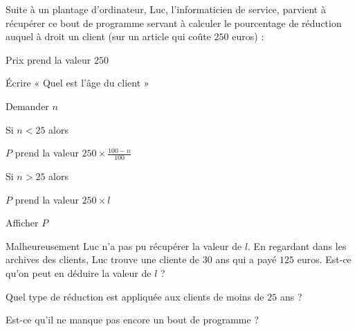 
\begin{exercice}\label{exosmath-0555}

Suite à un plantage d'ordinateur, Luc, l'informaticien de service, parvient à récupérer ce bout de programme servant à calculer le pourcentage de réduction auquel à droit un client (sur un article qui coûte \( 250\) euros) :
\begin{fmpage}{0.9\linewidth}

    Prix prend la valeur \( 250\)

    Écrire « Quel est l'âge du client » 

    Demander \( n\)

    Si \( n < 25\) alors

    \hspace{1cm} \( P\) prend la valeur \( 250\times \frac{ 100-n }{ 100 }\)

    Si \( n > 25 \) alors

    \hspace{1cm} \( P\) prend la valeur \( 250\times l\)

    Afficher \( P\)

\end{fmpage}

Malheureusement Luc n'a pas pu récupérer la valeur de \( l\). En regardant dans les archives des clients, Luc trouve une cliente de \( 30\) ans qui a payé \( 125\) euros. Est-ce qu'on peut en déduire la valeur de \( l\) ?

Quel type de réduction est appliquée aux clients de moins de \( 25\) ans ?

Est-ce qu'il ne manque pas encore un bout de programme ?

\end{exercice}
